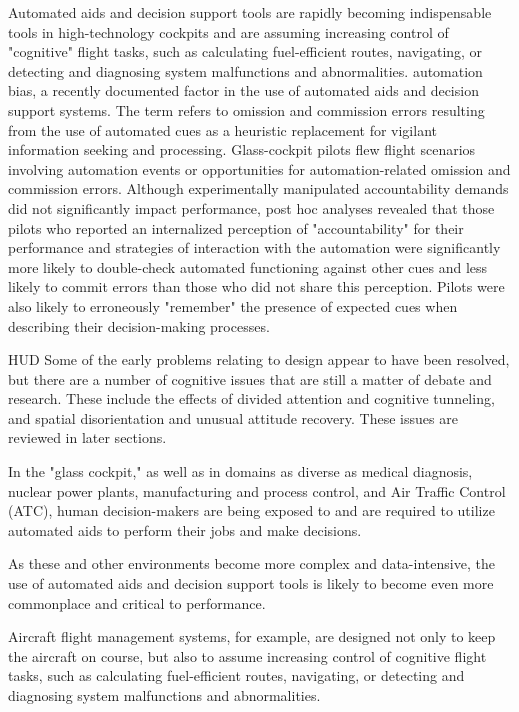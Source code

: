 \documentclass[utf8,bachelor,manualbib]{gradu3}
\begin{document}
Automated aids and decision support tools are rapidly becoming indispensable tools
in high-technology cockpits and are assuming increasing control of "cognitive" flight tasks, such as calculating fuel-efficient routes, navigating, or detecting and diagnosing system malfunctions and abnormalities. automation bias, a recently documented factor in the use of automated aids and decision support systems. The term refers to omission and commission errors resulting from the use of automated cues as a heuristic replacement for vigilant information seeking and processing. Glass-cockpit pilots flew flight scenarios involving automation events or opportunities for automation-related omission and commission errors. Although experimentally manipulated accountability demands did not significantly impact performance, post hoc analyses revealed that those pilots who reported an internalized perception of "accountability" for their performance and strategies of interaction with the automation were significantly more likely to double-check
automated functioning against other cues and less likely to commit errors than those who did not share this perception. Pilots were also likely to erroneously "remember" the presence of expected cues when describing their decision-making processes. \citep{mosierym1998}



HUD
Some of the
early problems relating to design appear to have been resolved, but there are a
number of cognitive issues that are still a matter of debate and research. These include
the effects of divided attention and cognitive tunneling, and spatial disorientation
and unusual attitude recovery. These issues are reviewed in later sections. \citep{crawfordneal2006}




In the "glass cockpit," as well as in domains as diverse as medical diagnosis, nuclear power plants, manufacturing and process control, and Air Traffic Control (ATC), human decision-makers are being exposed to and are required to utilize automated aids to perform their jobs and make decisions.

As these and other environments become more complex and data-intensive, the use of automated aids and decision support tools is likely to become even more commonplace and critical to performance.

Aircraft flight management systems, for example, are designed not only to keep the aircraft on course, but also to assume increasing control of cognitive flight tasks, such as calculating fuel-efficient routes, navigating, or detecting and diagnosing system malfunctions and abnormalities.
\end{document}
